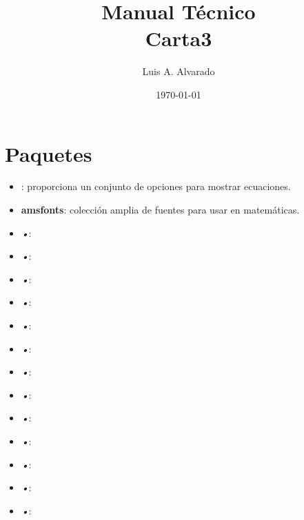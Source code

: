 \documentclass[12pt]{article}
\title{Manual Técnico \\ Carta3}
\author{Luis A. Alvarado}
\date{\today}
\begin{document}
\maketitle{}

\tableofcontents

\clearpage
\newpage

\section{Paquetes}
\begin{itemize}
	\item \textit{}: \cite{amsmath} proporciona un conjunto de opciones para mostrar ecuaciones.
	\item \textbf{amsfonts}: colección amplia de fuentes para usar en matemáticas.
	\item \textit{•}:
	\item \textit{•}:
	\item \textit{•}:
	\item \textit{•}:
	\item \textit{•}:
	\item \textit{•}:
	\item \textit{•}:
	\item \textit{•}:
	\item \textit{•}:
	\item \textit{•}:
	\item \textit{•}:
	\item \textit{•}:
	\item \textit{•}:
\end{itemize}
{}

\end{document}
